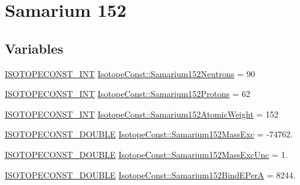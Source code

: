 \hypertarget{group___isotope_const-_samarium-_sm152}{}\section{Samarium 152}
\label{group___isotope_const-_samarium-_sm152}
\subsection*{Variables}
\begin{DoxyCompactItemize}
\item 
\mbox{\hyperlink{group___isotope_const-_macros_ga5f18360b3e99483a35c32d789e62621c}{I\+S\+O\+T\+O\+P\+E\+C\+O\+N\+S\+T\+\_\+\+I\+NT}} \mbox{\hyperlink{group___isotope_const-_samarium-_sm152_ga1a0c7364d981962072791a421d4b59e8}{Isotope\+Const\+::\+Samarium152\+Neutrons}} = 90
\item 
\mbox{\hyperlink{group___isotope_const-_macros_ga5f18360b3e99483a35c32d789e62621c}{I\+S\+O\+T\+O\+P\+E\+C\+O\+N\+S\+T\+\_\+\+I\+NT}} \mbox{\hyperlink{group___isotope_const-_samarium-_sm152_ga3c1422d06d2fddbdfbcd91eb47f2ad2c}{Isotope\+Const\+::\+Samarium152\+Protons}} = 62
\item 
\mbox{\hyperlink{group___isotope_const-_macros_ga5f18360b3e99483a35c32d789e62621c}{I\+S\+O\+T\+O\+P\+E\+C\+O\+N\+S\+T\+\_\+\+I\+NT}} \mbox{\hyperlink{group___isotope_const-_samarium-_sm152_ga8fbbb75b19d3fe4c44250b2af6fd5e64}{Isotope\+Const\+::\+Samarium152\+Atomic\+Weight}} = 152
\item 
\mbox{\hyperlink{group___isotope_const-_macros_ga8f45a7272ce02c0b4c65c44636ed719a}{I\+S\+O\+T\+O\+P\+E\+C\+O\+N\+S\+T\+\_\+\+D\+O\+U\+B\+LE}} \mbox{\hyperlink{group___isotope_const-_samarium-_sm152_gae08c3ca489730b5144803efdefeea878}{Isotope\+Const\+::\+Samarium152\+Mass\+Exc}} = -\/74762.
\item 
\mbox{\hyperlink{group___isotope_const-_macros_ga8f45a7272ce02c0b4c65c44636ed719a}{I\+S\+O\+T\+O\+P\+E\+C\+O\+N\+S\+T\+\_\+\+D\+O\+U\+B\+LE}} \mbox{\hyperlink{group___isotope_const-_samarium-_sm152_gafd638d841069b7efb8a5754932ca83ea}{Isotope\+Const\+::\+Samarium152\+Mass\+Exc\+Unc}} = 1.
\item 
\mbox{\hyperlink{group___isotope_const-_macros_ga8f45a7272ce02c0b4c65c44636ed719a}{I\+S\+O\+T\+O\+P\+E\+C\+O\+N\+S\+T\+\_\+\+D\+O\+U\+B\+LE}} \mbox{\hyperlink{group___isotope_const-_samarium-_sm152_gab146c85c94d10f52dacebfb4ea4b4089}{Isotope\+Const\+::\+Samarium152\+Bind\+E\+PerA}} = 8244.
\item 

\end{DoxyCompactItemize}
